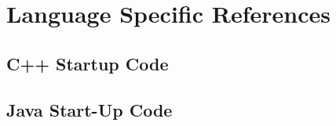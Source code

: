 
\chapter{Language Specific References}
\chapterinfo{}
	\section{C++ Startup Code}
	
	

	
	\section{Java Start-Up Code}
	
	
	
